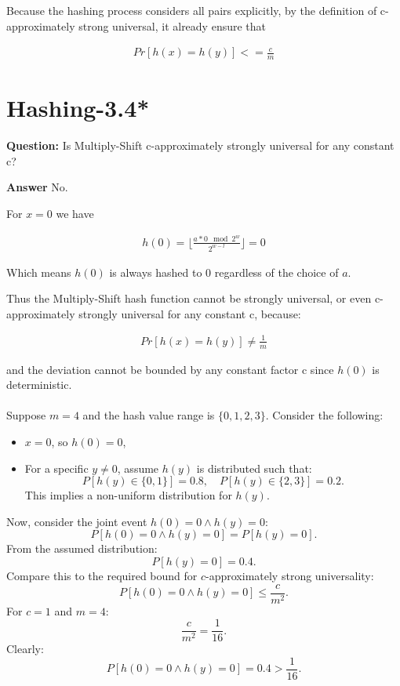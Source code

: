 \documentclass[12pt]{article}
\begin{document}
Because the hashing process considers all pairs explicitly, by the definition of c-approximately strong universal, it already ensure that 

\begin{equation}
\begin{aligned}
Pr[h(x)=h(y)] <= \frac{c}{m}
\end{aligned}
\end{equation}

\section{Hashing-3.4*}
\textbf{Question:} Is Multiply-Shift c-approximately strongly universal for any constant c?

\textbf{Answer}
No. 

For $x=0$ we have 

\begin{equation}
\begin{aligned}
h(0) = \lfloor \frac{a * 0 \mod 2^w}{2^{w-l}} \rfloor = 0
\end{aligned}
\end{equation}

Which means $h(0)$ is always hashed to 0 regardless of the choice of $a$. 

Thus the Multiply-Shift hash function cannot be strongly universal, or even c-approximately strongly universal for any constant c, because:

\begin{equation}
\begin{aligned}
Pr[h(x)=h(y)] \neq \frac{1}{m}
\end{aligned}
\end{equation}

and the deviation cannot be bounded by any constant factor c since $h(0)$ is deterministic.\\
\\
Suppose $m = 4$ and the hash value range is $\{0, 1, 2, 3\}$. Consider the following:
\begin{itemize}
    \item $x = 0$, so $h(0) = 0$,
    \item For a specific $y \neq 0$, assume $h(y)$ is distributed such that:
    \[
    P[h(y) \in \{0, 1\}] = 0.8, \quad P[h(y) \in \{2, 3\}] = 0.2.
    \]
    This implies a non-uniform distribution for $h(y)$.
\end{itemize}
Now, consider the joint event $h(0) = 0 \wedge h(y) = 0$:
\[
P[h(0) = 0 \wedge h(y) = 0] = P[h(y) = 0].
\]
From the assumed distribution:
\[
P[h(y) = 0] = 0.4.
\]
Compare this to the required bound for $c$-approximately strong universality:
\[
P[h(0) = 0 \wedge h(y) = 0] \leq \frac{c}{m^2}.
\]
For $c = 1$ and $m = 4$:
\[
\frac{c}{m^2} = \frac{1}{16}.
\]
Clearly:
\[
P[h(0) = 0 \wedge h(y) = 0] = 0.4 > \frac{1}{16}.
\]
\end{document}
